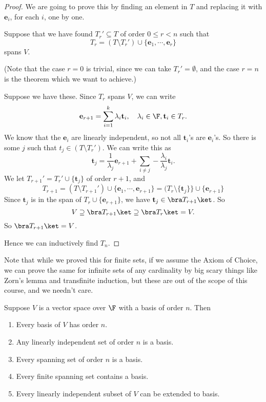 \documentclass[a4paper]{article}
\begin{document}
\begin{proof}
  We are going to prove this by finding an element in $T$ and replacing it with $\mathbf{e}_i$, for each $i$, one by one.

  Suppose that we have found $T_r'\subseteq T$ of order $0 \leq r < n$ such that
  \[
    T_r = (T\setminus T_r') \cup \{\mathbf{e}_1, \cdots, \mathbf{e}_r\}
  \]
  spans $V$.

  (Note that the case $r = 0$ is trivial, since we can take $T_r' = \emptyset$, and the case $r = n$ is the theorem which we want to achieve.)

  Suppose we have these. Since $T_r$ spans $V$, we can write
  \[
    \mathbf{e}_{r + 1} = \sum_{i = 1}^k \lambda_i \mathbf{t}_i,\quad \lambda_i \in \F, \mathbf{t}_i \in T_r.
  \]
  We know that the $\mathbf{e}_i$ are linearly independent, so not all $\mathbf{t}_i$'s are $\mathbf{e}_i$'s. So there is some $j$ such that $t_j \in (T\setminus T_r')$.  We can write this as
  \[
    \mathbf{t}_j = \frac{1}{\lambda_j} \mathbf{e}_{r + 1} + \sum_{i \not= j} -\frac{\lambda_i}{\lambda_j} \mathbf{t}_i.
  \]
  We let $T_{r + 1}' = T_r' \cup \{\mathbf{t}_j\}$ of order $r + 1$, and
  \[
    T_{r + 1} = (T\setminus T_{r + 1}') \cup \{\mathbf{e}_1, \cdots, \mathbf{e}_{r + 1}\} = (T_r \setminus \{\mathbf{t}_j\}\} \cup \{\mathbf{e}_{r + 1}\}
  \]
  Since $\mathbf{t}_j$ is in the span of $T_r\cup \{\mathbf{e}_{r + 1}\}$, we have $\mathbf{t}_j \in \bra T_{r + 1}\ket$. So
  \[
    V \supseteq \bra T_{r + 1}\ket \supseteq \bra T_r \ket = V.
  \]
  So $\bra T_{r + 1}\ket = V$.

  Hence we can inductively find $T_n$.
\end{proof}
Note that while we proved this for finite sets, if we assume the Axiom of Choice, we can prove the same for infinite sets of any cardinality by big scary things like Zorn's lemma and transfinite induction, but these are out of the scope of this course, and we needn't care.

\begin{cor}
  Suppose $V$ is a vector space over $\F$ with a basis of order $n$. Then
  \begin{enumerate}
    \item Every basis of $V$ has order $n$.
    \item Any linearly independent set of order $n$ is a basis.
    \item Every spanning set of order $n$ is a basis.
    \item Every finite spanning set contains a basis.
    \item Every linearly independent subset of $V$ can be extended to basis.
  \end{enumerate}
\end{cor}
\end{document}
